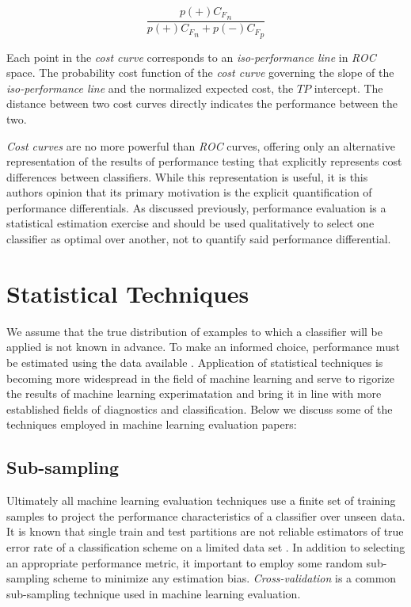 \documentclass[10pt]{unbthesis}
\begin{document}
\begin{equation}
\label{equ:probcostfunc}
\frac{p(+){C_F}_n}{p(+){C_F}_n + p(-){C_F}_p}
\end{equation}

Each point in the \textit{cost curve} corresponds to an
\textit{iso-performance line} in \textit{ROC} space. The probability
cost function of the \textit{cost curve} governing the slope of the
\textit{iso-performance line} and the normalized expected cost, the
\(TP\) intercept. The distance between two cost curves directly
indicates the performance between the two. 

\textit{Cost curves} are no more powerful than \textit{ROC} curves,
offering only an alternative representation of the results of
performance testing that explicitly represents cost differences
between classifiers. While this representation is useful, it is this
authors opinion that its primary motivation is the explicit
quantification of performance differentials. As discussed previously,
performance evaluation is a statistical estimation exercise and should
be used qualitatively to select one classifier as optimal over
another, not to quantify said performance differential.

\section{Statistical Techniques}
We assume that the true distribution of examples to which a classifier
will be applied is not known in advance. To make an informed choice,
performance must be estimated using the data available
\cite{RefWorks:45}. Application of statistical techniques is
becoming more widespread in the field of machine learning and serve to
rigorize the results of machine learning experimatation and bring it
 in line with more established fields of diagnostics and
classification. Below we discuss some of the techniques employed in
machine learning evaluation papers:

\subsection{Sub-sampling}
Ultimately all machine learning evaluation techniques use a finite set
of training samples to project the performance characteristics of a
classifier over unseen data. It is known that single train and test
partitions are not reliable estimators of true error rate of a
classification scheme on a limited data set \cite{RefWorks:57}. In
addition to selecting an appropriate performance metric, it important
to employ some random sub-sampling scheme to minimize any estimation
bias. \textit{Cross-validation} is a common sub-sampling technique
used in machine learning evaluation.
\end{document}
